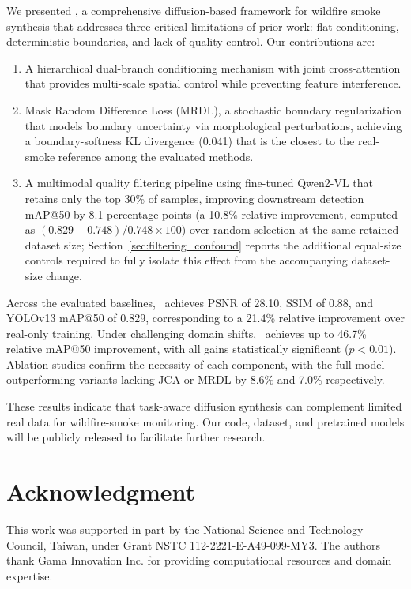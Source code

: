 \documentclass[journal]{IEEEtran}
\begin{document}
We presented \method, a comprehensive diffusion-based framework for wildfire smoke synthesis that addresses three critical limitations of prior work: flat conditioning, deterministic boundaries, and lack of quality control. Our contributions are:

\begin{enumerate}
    \item A hierarchical dual-branch conditioning mechanism with joint cross-attention that provides multi-scale spatial control while preventing feature interference.
    \item Mask Random Difference Loss (MRDL), a stochastic boundary regularization that models boundary uncertainty via morphological perturbations, achieving a boundary-softness KL divergence (0.041) that is the closest to the real-smoke reference among the evaluated methods.
    \item A multimodal quality filtering pipeline using fine-tuned Qwen2-VL that retains only the top 30\% of samples, improving downstream detection mAP@50 by 8.1 percentage points (a 10.8\% relative improvement, computed as $(0.829-0.748)/0.748\times100$) over random selection at the same retained dataset size; Section~\ref{sec:filtering_confound} reports the additional equal-size controls required to fully isolate this effect from the accompanying dataset-size change.
\end{enumerate}

Across the evaluated baselines, \method~achieves PSNR of 28.10, SSIM of 0.88, and YOLOv13 mAP@50 of 0.829, corresponding to a 21.4\% relative improvement over real-only training. Under challenging domain shifts, \method~achieves up to 46.7\% relative mAP@50 improvement, with all gains statistically significant ($p<0.01$). Ablation studies confirm the necessity of each component, with the full model outperforming variants lacking JCA or MRDL by 8.6\% and 7.0\% respectively.

These results indicate that task-aware diffusion synthesis can complement limited real data for wildfire-smoke monitoring. Our code, dataset, and pretrained models will be publicly released to facilitate further research.

\section*{Acknowledgment}

This work was supported in part by the National Science and Technology Council, Taiwan, under Grant NSTC 112-2221-E-A49-099-MY3. The authors thank Gama Innovation Inc. for providing computational resources and domain expertise. 



\end{document}
